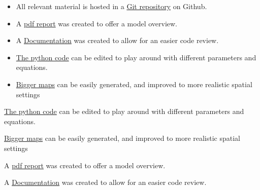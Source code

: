     \begin{frame}{\ba}{\baa}
      \begin{itemize}
       \item<2-> All relevant material is hosted in a \href{https://github.com/Anon75014/AgentBasedModellingGit}{Git repository} on Github.
       \item<3-> A \href{https://github.com/Anon75014/AgentBasedModelling/blob/main/Report/main.pdf}{pdf report} was created to offer a model overview.
       \item<4-> A \href{https://n.ethz.ch/%7Ecgolling/gess/html/overview.html}{Documentation} was created to allow for an easier code review.
       \item<5-> \href{https://github.com/Anon75014/AgentBasedModelling/tree/main/python}{The python code} can be edited to play around with different parameters and equations.
       \item<6->  \href{https://n.ethz.ch/%7Ecgolling/gess/html/VIS_map.html}{Bigger maps} can be easily generated, and improved to more realistic spatial settings
     \end{itemize}
    \end{frame}

    \item<5->{\href{https://github.com/Anon75014/AgentBasedModelling/tree/main/python}{The python code} can be edited to play around with different parameters and equations.}
    \item<6->{\href{https://n.ethz.ch/%7Ecgolling/gess/html/VIS_map.html}{Bigger maps} can be easily generated, and improved to more realistic spatial settings}
    \item     \item<3->{A \href{https://github.com/Anon75014/AgentBasedModelling/blob/main/Report/main.pdf}{pdf report} was created to offer a model overview.}
    \item<4->{A \href{https://n.ethz.ch/%7Ecgolling/gess/html/overview.html}{Documentation} was created to allow for an easier code review.}